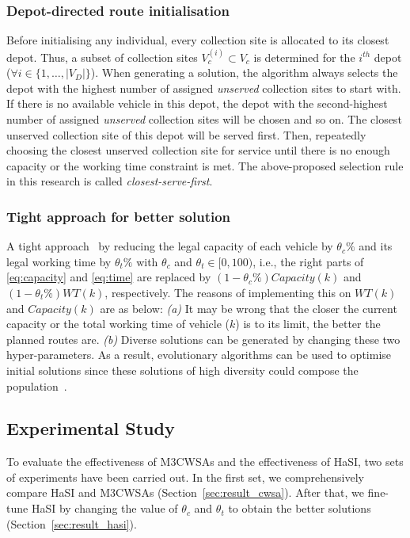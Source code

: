 \documentclass[journal]{IEEEtran}
\begin{document}
\subsubsection{Depot-directed route initialisation}
Before initialising any individual, every collection site is allocated to its closest depot. Thus, a subset of collection sites $V_c^{(i)} \subset V_c$ is determined for the $i^{th}$ depot ($\forall i \in \{1,\dots, |V_D|\}$).
When generating a solution, the algorithm always selects the depot with the highest number of assigned \emph{unserved} collection sites to start with. If there is no available vehicle in this depot, the depot with the second-highest number of assigned \emph{unserved} collection sites will be chosen and so on. The closest unserved collection site of this depot will be served first. Then, repeatedly choosing the closest unserved collection site for service until there is no enough capacity or the working time constraint is met. The above-proposed selection rule in this research is called \emph{closest-serve-first}.

\subsubsection{Tight approach for better solution}
A tight approach~\cite{Fleury02robustnessevaluation} by reducing the legal capacity of each vehicle by $\theta_c\%$ and its legal working time by $\theta_t\%$ with $\theta_c$ and $\theta_t \in [0,100)$, i.e., the right parts of \eqref{eq:capacity} and \eqref{eq:time} are replaced by $(1-\theta_c\%) Capacity(k)$ and $(1-\theta_t\%)WT(k)$, respectively. The reasons of implementing this on $WT(k)$ and $Capacity(k)$ are as below: \emph{(a)} It may be wrong that the closer the current capacity or the total working time of vehicle ($k$) is to its limit, the better the planned routes are. \emph{(b)} Diverse solutions can be generated by changing these two hyper-parameters. As a result, evolutionary algorithms can be used to optimise initial solutions since these solutions of high diversity could compose the population~\cite{yuan2008research}.

\subsection{Experimental Study}\label{init_es}
To evaluate the effectiveness of M3CWSAs and the effectiveness of HaSI, two sets of experiments have been carried out. In the first set, we comprehensively compare HaSI and M3CWSAs (Section~\ref{sec:result_cwsa}). After that, we fine-tune HaSI by changing the value of $\theta_c$ and $\theta_t$ to obtain the better solutions (Section~\ref{sec:result_hasi}).
\end{document}
